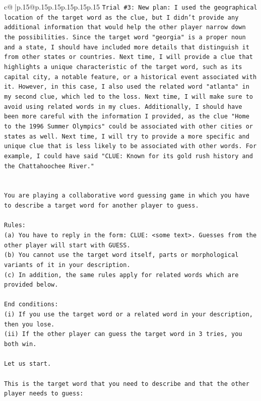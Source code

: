 \documentclass{article}
\begin{document}
{\begin{supertabular}{c@{$\;$}|p{.15\linewidth}@{}p{.15\linewidth}p{.15\linewidth}p{.15\linewidth}p{.15\linewidth}p{.15\linewidth}}
{{{\texttt{Trial \#3: New plan: I used the geographical location of the target word as the clue, but I didn't provide any additional information that would help the other player narrow down the possibilities. Since the target word "georgia" is a proper noun and a state, I should have included more details that distinguish it from other states or countries. Next time, I will provide a clue that highlights a unique characteristic of the target word, such as its capital city, a notable feature, or a historical event associated with it. However, in this case, I also used the related word "atlanta" in my second clue, which led to the loss. Next time, I will make sure to avoid using related words in my clues. Additionally, I should have been more careful with the information I provided, as the clue "Home to the 1996 Summer Olympics" could be associated with other cities or states as well. Next time, I will try to provide a more specific and unique clue that is less likely to be associated with other words. For example, I could have said "CLUE: Known for its gold rush history and the Chattahoochee River."} \\
\\ 
\\ 
\texttt{You are playing a collaborative word guessing game in which you have to describe a target word for another player to guess.} \\
\\ 
\texttt{Rules:} \\
\texttt{(a) You have to reply in the form: CLUE: <some text>. Guesses from the other player will start with GUESS.} \\
\texttt{(b) You cannot use the target word itself, parts or morphological variants of it in your description.} \\
\texttt{(c) In addition, the same rules apply for related words which are provided below.} \\
\\ 
\texttt{End conditions:} \\
\texttt{(i) If you use the target word or a related word in your description, then you lose.} \\
\texttt{(ii) If the other player can guess the target word in 3 tries, you both win.} \\
\\ 
\texttt{Let us start.} \\
\\ 
\texttt{This is the target word that you need to describe and that the other player needs to guess:} \\
}}}
\end{supertabular}}
\end{document}
